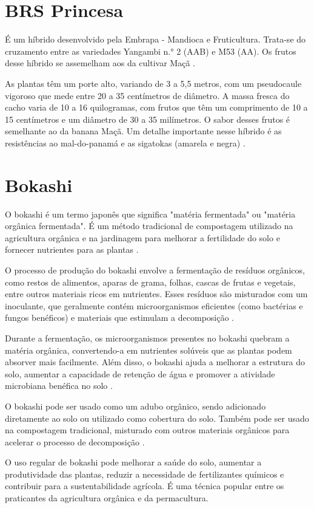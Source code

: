 \section{BRS Princesa}
É um híbrido desenvolvido pela Embrapa - Mandioca e Fruticultura. Trata-se do cruzamento entre as variedades Yangambi n.° 2 (AAB) e M53 (AA). Os frutos desse híbrido se assemelham aos da cultivar Maçã \cite{cultivodebananeira}. 

As plantas têm um porte alto, variando de 3 a 5,5 metros, com um pseudocaule vigoroso que mede entre 20 a 35 centímetros de diâmetro. A massa fresca do cacho varia de 10 a 16 quilogramas, com frutos que têm um comprimento de 10 a 15 centímetros e um diâmetro de 30 a 35 milímetros. O sabor desses frutos é semelhante ao da banana Maçã. Um detalhe importante nesse híbrido é as resistências ao mal-do-panamá e as sigatokas (amarela e negra) \cite{cultivodebananeira}.


\section{Bokashi}
O bokashi é um termo japonês que significa "matéria fermentada" ou "matéria orgânica fermentada". É um método tradicional de compostagem utilizado na agricultura orgânica e na jardinagem para melhorar a fertilidade do solo e fornecer nutrientes para as plantas \cite{bokashi1}.

O processo de produção do bokashi envolve a fermentação de resíduos orgânicos, como restos de alimentos, aparas de grama, folhas, cascas de frutas e vegetais, entre outros materiais ricos em nutrientes. Esses resíduos são misturados com um inoculante, que geralmente contém microorganismos eficientes (como bactérias e fungos benéficos) e materiais que estimulam a decomposição \cite{bokashi1}.

Durante a fermentação, os microorganismos presentes no bokashi quebram a matéria orgânica, convertendo-a em nutrientes solúveis que as plantas podem absorver mais facilmente. Além disso, o bokashi ajuda a melhorar a estrutura do solo, aumentar a capacidade de retenção de água e promover a atividade microbiana benéfica no solo \cite{bokashi1}.

O bokashi pode ser usado como um adubo orgânico, sendo adicionado diretamente ao solo ou utilizado como cobertura do solo. Também pode ser usado na compostagem tradicional, misturado com outros materiais orgânicos para acelerar o processo de decomposição \cite{bokashi1}.

O uso regular de bokashi pode melhorar a saúde do solo, aumentar a produtividade das plantas, reduzir a necessidade de fertilizantes químicos e contribuir para a sustentabilidade agrícola. É uma técnica popular entre os praticantes da agricultura orgânica e da permacultura.
